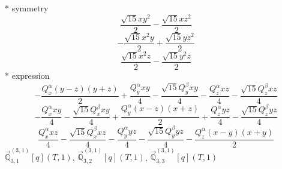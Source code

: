 \documentclass[fleqn,8pt]{jsarticle}
\begin{document}
\noindent\quad ** symmetry
\begin{dmath*}
\frac{\sqrt{15} x y^{2}}{2} - \frac{\sqrt{15} x z^{2}}{2}
\end{dmath*}
\begin{dmath*}
- \frac{\sqrt{15} x^{2} y}{2} + \frac{\sqrt{15} y z^{2}}{2}
\end{dmath*}
\begin{dmath*}
\frac{\sqrt{15} x^{2} z}{2} - \frac{\sqrt{15} y^{2} z}{2}
\end{dmath*}
\noindent\quad ** expression
\begin{dmath*}
- \frac{Q_{x}^{\alpha} \left(y - z\right) \left(y + z\right)}{2} + \frac{Q_{y}^{\alpha} x y}{4} - \frac{\sqrt{15} Q_{y}^{\beta} x y}{4} - \frac{Q_{z}^{\alpha} x z}{4} - \frac{\sqrt{15} Q_{z}^{\beta} x z}{4}
\end{dmath*}
\begin{dmath*}
- \frac{Q_{x}^{\alpha} x y}{4} - \frac{\sqrt{15} Q_{x}^{\beta} x y}{4} + \frac{Q_{y}^{\alpha} \left(x - z\right) \left(x + z\right)}{2} + \frac{Q_{z}^{\alpha} y z}{4} - \frac{\sqrt{15} Q_{z}^{\beta} y z}{4}
\end{dmath*}
\begin{dmath*}
\frac{Q_{x}^{\alpha} x z}{4} - \frac{\sqrt{15} Q_{x}^{\beta} x z}{4} - \frac{Q_{y}^{\alpha} y z}{4} - \frac{\sqrt{15} Q_{y}^{\beta} y z}{4} - \frac{Q_{z}^{\alpha} \left(x - y\right) \left(x + y\right)}{2}
\end{dmath*}
\noindent\quad $\vec{\mathbb{Q}}_{3,1}^{(3,1)}[q](T,1)$, $\vec{\mathbb{Q}}_{3,2}^{(3,1)}[q](T,1)$, $\vec{\mathbb{Q}}_{3,3}^{(3,1)}[q](T,1)$
\end{document}

